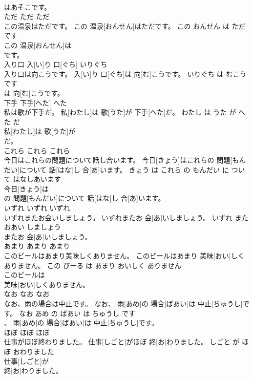 \documentclass[8pt]{extreport}
\begin{document}
\begin{CJK}{UTF8}{min}
\\	はあそこです。			
\\	ただ	ただ	ただ	
\\	この温泉はただです。	この 温泉[おんせん]はただです。	この おんせん は ただ です	
\\	この 温泉[おんせん]は
\\	です。			
\\	入り口	入[い]り 口[ぐち]	いりぐち	
\\	入り口は向こうです。	入[い]り 口[ぐち]は 向[む]こうです。	いりぐち は むこう です	
\\	は 向[む]こうです。			
\\	下手	下手[へた]	へた	
\\	私は歌が下手だ。	私[わたし]は 歌[うた]が 下手[へた]だ。	わたし は うた が へた だ	
\\	私[わたし]は 歌[うた]が
\\	だ。			
\\	これら	これら	これら	
\\	今日はこれらの問題について話し合います。	今日[きょう]はこれらの 問題[もんだい]について 話[はな]し 合[あ]います。	きょう は これら の もんだい に ついて はなしあいます	
\\	今日[きょう]は
\\	の 問題[もんだい]について 話[はな]し 合[あ]います。			
\\	いずれ	いずれ	いずれ	
\\	いずれまたお会いしましょう。	いずれまたお 会[あ]いしましょう。	いずれ また おあい しましょう	
\\	またお 会[あ]いしましょう。			
\\	あまり	あまり	あまり	
\\	このビールはあまり美味しくありません。	このビールはあまり 美味[おい]しくありません。	この びーる は あまり おいしく ありません	
\\	このビールは
\\	美味[おい]しくありません。			
\\	なお	なお	なお	
\\	なお、雨の場合は中止です。	なお、 雨[あめ]の 場合[ばあい]は 中止[ちゅうし]です。	なお あめ の ばあい は ちゅうし です	
\\	、 雨[あめ]の 場合[ばあい]は 中止[ちゅうし]です。			
\\	ほぼ	ほぼ	ほぼ	
\\	仕事がほぼ終わりました。	仕事[しごと]がほぼ 終[お]わりました。	しごと が ほぼ おわりました	
\\	仕事[しごと]が
\\	終[お]わりました。			

\end{CJK}
\end{document}
